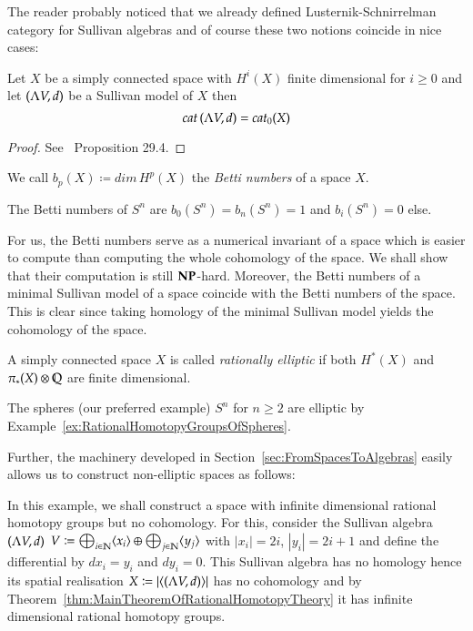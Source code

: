 The reader probably noticed that we already defined Lusternik-Schnirrelman category for Sullivan algebras and
of course these two notions coincide in nice cases:

\begin{Proposition}
 Let $X$ be a simply connected space with $H^i(X)$ finite dimensional for $i \geq 0$ and let $(\Lambda V,d)$ be 
 a Sullivan model of $X$ then
 $$ cat \, (\Lambda V,d) = cat_0 (X)$$
\end{Proposition}

\begin{proof}
 See~\cite{Felix2001} Proposition 29.4.
\end{proof}

\begin{Definition}
 We call $b_p (X) \coloneqq dim \, H^p(X)$ the \emph{Betti numbers} of a space $X$.
\end{Definition}

\begin{Example}
 The Betti numbers of $S^n$ are $b_0(S^n) = b_n(S^n) = 1$ and $ b_i(S^n) = 0$ else.
\end{Example}

For us, the Betti numbers serve as a numerical invariant of a space which is easier to compute than computing the whole cohomology
of the space. We shall show that their computation is still $\mathbf{NP}$-hard. Moreover, the Betti numbers
of a minimal Sullivan model of a space coincide with the Betti numbers of the space. This is clear since taking 
homology of the minimal Sullivan model yields the cohomology of the space.

\begin{Definition}
 A simply connected space $X$ is called \emph{rationally elliptic} if both $H^*(X)$ and $\pi_*(X) \otimes \mathbb{Q}$ are finite dimensional.
\end{Definition}

\begin{Example}
 The spheres (our preferred example) $S^n$ for $n \geq 2$ are elliptic by Example~\ref{ex:RationalHomotopyGroupsOfSpheres}.
\end{Example}

Further, the machinery developed in Section~\ref{sec:FromSpacesToAlgebras} easily allows us to construct non-elliptic spaces 
as follows:
 \begin{Example}
  In this example, we shall construct a space with infinite dimensional rational homotopy groups but no cohomology.
  For this, consider the Sullivan algebra $(\Lambda V,d)$
  ${V \coloneqq \bigoplus_{i \in \mathbb{N}} \langle x_i \rangle \oplus \bigoplus_{j \in \mathbb{N}} \langle y_j \rangle}$ with
  $|x_i| = 2i$, $|y_i| = 2i + 1$ and define the differential by $dx_i = y_i$ and $dy_i = 0$. This Sullivan algebra
  has no homology hence its spatial realisation $ X \coloneqq | \langle (\Lambda V,d) \rangle |$ has no cohomology and
  by Theorem~\ref{thm:MainTheoremOfRationalHomotopyTheory} it has infinite dimensional rational homotopy groups.
 \end{Example}
 
